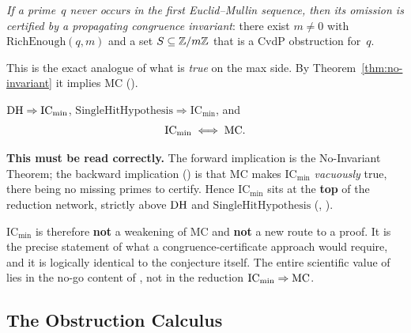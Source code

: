 \begin{definition}
\label{def:ic-min}
\emph{If a prime~$q$ never occurs in the first Euclid--Mullin sequence,
then its omission is certified by a propagating congruence invariant}:
there exist $m \neq 0$ with $\mathrm{RichEnough}(q,m)$ and a set
$S \subseteq \mathbb{Z}/m\mathbb{Z}$ that is a CvdP obstruction for~$q$.
\end{definition}

\noindent
This is the exact analogue of what is \emph{true} on the max side.  By
Theorem~\ref{thm:no-invariant} it implies MC
().

\begin{keyresult}
\begin{theorem}
\label{thm:ic-min-network}
$\mathrm{DH} \Rightarrow \mathrm{IC}_{\min}$,
$\mathrm{SingleHitHypothesis} \Rightarrow \mathrm{IC}_{\min}$, and
\[
  \mathrm{IC}_{\min} \iff \mathrm{MC} .
\]
\end{theorem}
\end{keyresult}

\noindent
\textbf{This must be read correctly.}  The forward implication is the
No-Invariant Theorem; the backward implication
() is that
MC makes $\mathrm{IC}_{\min}$ \emph{vacuously} true, there being no
missing primes to certify.  Hence $\mathrm{IC}_{\min}$ sits at the
\textbf{top} of the reduction network, strictly above
$\mathrm{DH}$ and $\mathrm{SingleHitHypothesis}$
(,
).

$\mathrm{IC}_{\min}$ is therefore \textbf{not} a weakening of MC and
\textbf{not} a new route to a proof.  It is the precise statement of
what a congruence-certificate approach would require, and it is
logically identical to the conjecture itself.  The entire scientific
value of  lies in the no-go content
of , not in the reduction $\mathrm{IC}_{\min}
\Rightarrow \mathrm{MC}$.

\subsection{The Obstruction Calculus}
\label{sec:obstruction-calculus}

